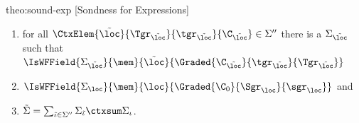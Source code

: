 \begin{proofOf}{theo:sound-exp} [Sondness for Expressions]
\begin{description}
\begin{enumerate}%
\item \label{it1}
for all $\CtxElem{{\tilde{\loc}}}{\Tgr_{\tilde{\loc}}}{\tgr_{\tilde{\loc}}}{\C_{\tilde{\loc}}}\in\Sigma''$ there
is a $\Sigma_{\tilde\loc}$ such that $\IsWFField{\Sigma_{\tilde\loc}}{\mem}{{\tilde\loc}}{\Graded{\C_{\tilde\loc}}{\tgr_{\tilde\loc}}{\Tgr_{\tilde\loc}}}$ 
\item \label{it2} $\IsWFField{\Sigma_{\loc}}{\mem}{\loc}{\Graded{\C_0}{\Sgr_{\loc}}{\sgr_{\loc}}}$ and 
\item \label{it3} $\tilde{\Sigma}=\sum_{\tilde\iota\in\Sigma''}\Sigma_{\tilde\iota}\ctxsum\Sigma_\iota$.
\end{enumerate}


\end{description}
\end{proofOf}
